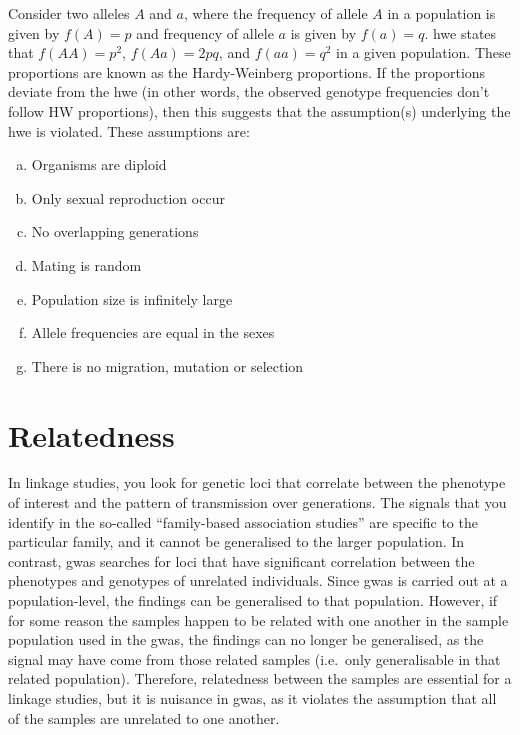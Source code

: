 Consider two alleles $A$ and $a$, where the frequency of allele $A$ in a population is given by $f(A) = p$ and frequency of allele $a$ is given by $f(a) = q$.
\Gls{hwe} states that $f(AA) = p^2$, $f(Aa) = 2pq$, and $f(aa) = q^2$ in a given population.
These proportions are known as the Hardy-Weinberg proportions.
If the proportions deviate from the \gls{hwe} (in other words, the observed genotype frequencies don't follow HW proportions), then this suggests that the assumption(s) underlying the \gls{hwe} is violated.
These assumptions are:
\begin{enumerate}[(a),noitemsep]
	\item Organisms are diploid
	\item Only sexual reproduction occur
	\item No overlapping generations
	\item Mating is random
	\item Population size is infinitely large
	\item Allele frequencies are equal in the sexes
	\item There is no migration, mutation or selection
\end{enumerate}

\section{Relatedness}
\label{sec:relatedness}

In linkage studies, you look for genetic loci that correlate between the phenotype of interest and the pattern of transmission over generations.
The signals that you identify in the so-called ``family-based association studies'' are specific to the particular family, and it cannot be generalised to the larger population.
In contrast, \gls{gwas} searches for loci that have significant correlation between the phenotypes and genotypes of unrelated individuals.
Since \gls{gwas} is carried out at a population-level, the findings can be generalised to that population.
However, if for some reason the samples happen to be related with one another in the sample population used in the \gls{gwas}, the findings can no longer be generalised, as the signal may have come from those related samples (i.e.\ only generalisable in that related population).
Therefore, relatedness between the samples are essential for a linkage studies, but it is nuisance in \gls{gwas}, as it violates the assumption that all of the samples are unrelated to one another.


